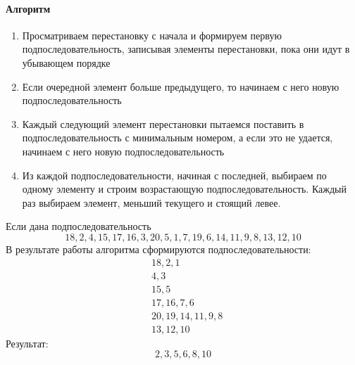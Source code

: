 \documentclass[main]{subfiles}
\begin{document}
\paragraph{Алгоритм}
\begin{enumerate}
    \item Просматриваем перестановку с начала и формируем первую 
подпоследовательность, записывая элементы перестановки, пока они идут в
убывающем порядке
    \item Если очередной элемент больше предыдущего, то начинаем с него
новую подпоследовательность
    \item Каждый следующий элемент перестановки пытаемся поставить в 
подпоследовательность с минимальным номером, а если это не удается, начинаем
с него новую подпоследовательность
    \item Из каждой подпоследовательности, начиная с последней, выбираем по 
одному элементу и строим возрастающую подпоследовательность. Каждый раз
выбираем элемент, меньший текущего и стоящий левее.
\end{enumerate} 
\begin{case}
    Если дана подпоследовательность
    \[18, 2, 4, 15, 17, 16, 3, 20, 5, 1, 7, 19, 6, 14, 11, 9, 8, 13, 12, 10\]
    В результате работы алгоритма сформируются подпоследовательности:
    \begin{align*}
        &18, 2, 1 \\
        &4, 3 \\
        &15, 5 \\
        &17, 16, 7, 6 \\
        &20, 19, 14, 11, 9, 8 \\
        &13, 12, 10
    \end{align*}
    Результат:
    \[2, 3, 5, 6, 8, 10\]
\end{case}
\end{document}
